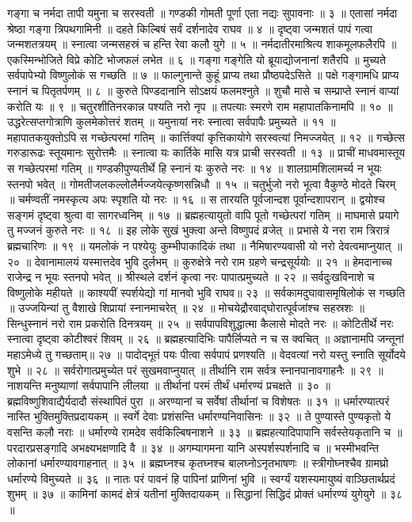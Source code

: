 गङ्गा च नर्मदा तापी यमुना च सरस्वती ॥
गण्डकी गोमती पूर्णा एता नद्यः सुपावनाः ॥ ३ ॥
एतासां नर्मदा श्रेष्ठा गङ्गा त्रिपथगामिनी ॥
दहते किल्बिषं सर्वं दर्शनादेव राघव ॥ ४ ॥
दृष्ट्वा जन्मशतं पापं गत्वा जन्मशतत्रयम् ॥
स्नात्वा जन्मसहस्रं च हन्ति रेवा कलौ युगे ॥ ५ ॥
नर्मदातीरमाश्रित्य शाकमूलफलैरपि ॥
एकस्मिन्भोजिते विप्रे कोटि भोजफलं लभेत ॥ ६ ॥
गङ्गा गङ्गेति यो ब्रूयाद्योजनानां शतैरपि ॥
मुच्यते सर्वपापेभ्यो विष्णुलोकं स गच्छति ॥ ७ ॥
फाल्गुनान्ते कुहूं प्राप्य तथा प्रौष्ठपदेऽसिते ॥
पक्षे गङ्गामधि प्राप्य स्नानं च पितृतर्पणम् ॥ ८ ॥
कुरुते पिण्डदानानि सोऽक्षयं फलमश्नुते ॥
शुचौ मासे च सम्प्राप्ते स्नानं वाप्यां करोति यः ॥ ९ ॥
चतुरशीतिनरकान्न पश्यति नरो नृप ॥
तपत्याः स्मरणे राम महापातकिनामपि ॥ १० ॥
उद्धरेत्सप्तगोत्राणि कुलमेकोत्तरं शतम् ॥
यमुनायां नरः स्नात्वा सर्वपापैः प्रमुच्यते ॥ ११ ॥
महापातकयुक्तोऽपि स गच्छेत्परमां गतिम् ॥
कार्त्तिक्यां कृत्तिकायोगे सरस्वत्यां निमज्जयेत् ॥ १२ ॥
गच्छेत्स गरुडारूढः स्तूयमानः सुरोत्तमैः ॥
स्नात्वा यः कार्तिके मासि यत्र प्राची सरस्वती ॥ १३ ॥
प्राचीं माधवमास्तूय स गच्छेत्परमां गतिम् ॥
गण्डकीपुण्यतीर्थे हि स्नानं यः कुरुते नरः ॥ १४ ॥
शालग्रामशिलामर्च्य न भूयः स्तनपो भवेत् ॥
गोमतीजलकल्लोलैर्मज्जयेत्कृष्णसन्निधौ ॥ १५ ॥
चतुर्भुजो नरो भूत्वा वैकुण्ठे मोदते चिरम् ॥
चर्मण्वतीं नमस्कृत्य अपः स्पृशति यो नरः ॥ १६ ॥
स तारयति पूर्वजान्दश पूर्वान्दशापरान् ॥
द्वयोश्च सङ्गमं दृष्ट्वा श्रुत्वा वा सागरध्वनिम् ॥ १७ ॥
ब्रह्महत्यायुतो वापि पूतो गच्छेत्परां गतिम् ॥
माघमासे प्रयागे तु मज्जनं कुरुते नरः ॥ १८ ॥
इह लोके सुखं भुक्त्वा अन्ते विष्णुपदं व्रजेत् ॥
प्रभासे ये नरा राम त्रिरात्रं ब्रह्मचारिणः ॥ १९ ॥
यमलोकं न पश्येयुः कुम्भीपाकादिकं तथा ॥
नैमिषारण्यवासी यो नरो देवत्वमाप्नुयात् ॥ २० ॥
देवानामालयं यस्मात्तदेव भुवि दुर्लभम् ॥
कुरुक्षेत्रे नरो राम ग्रहणे चन्द्रसूर्ययोः ॥ २१ ॥
हेमदानाच्च राजेन्द्र न भूयः स्तनपो भवेत् ॥
श्रीस्थले दर्शनं कृत्वा नरः पापात्प्रमुच्यते ॥ २२ ॥
सर्वदुःखविनाशे च विष्णुलोके महीयते ॥
काश्यपीं स्पर्शयेद्यो गां मानवो भुवि राघव॥ २३ ॥
सर्वकामदुघावासमृषिलोकं स गच्छति ॥
उज्जयिन्यां तु वैशाखे शिप्रायां स्नानमाचरेत् ॥ २४ ॥
मोचयेद्रौरवाद्घोरात्पूर्वजांश्च सहस्रशः ॥
सिन्धुस्नानं नरो राम प्रकरोति दिनत्रयम् ॥ २५ ॥
सर्वपापविशुद्धात्मा कैलासे मोदते नरः ॥
कोटितीर्थे नरः स्नात्वा दृष्ट्वा कोटीश्वरं शिवम् ॥ २६ ॥
ब्रह्महत्यादिभिः पापैर्लिप्यते न च स क्वचित् ॥
अज्ञानामपि जन्तूनां महाऽमेध्ये तु गच्छताम्॥ २७ ॥
पादोद्भूतं पयः पीत्वा सर्वपापं प्रणश्यति ॥
वेदवत्यां नरो यस्तु स्नाति सूर्योदये शुभे ॥ २८ ॥
सर्वरोगात्प्रमुच्येत परं सुखमवाप्नुयात् ॥
तीर्थानि राम सर्वत्र स्नानपानावगाहनैः ॥ २९ ॥
नाशयन्ति मनुष्याणां सर्वपापानि लीलया ॥
तीर्थानां परमं तीर्थं धर्मारण्यं प्रचक्षते ॥ ३० ॥
ब्रह्मविष्णुशिवाद्यैर्यदादौ संस्थापितं पुरा ॥
अरण्यानां च सर्वेषां तीर्थानां च विशेषतः ॥ ३१ ॥
धर्मारण्यात्परं नास्ति भुक्तिमुक्तिप्रदायकम् ॥
स्वर्गे देवाः प्रशंसन्ति धर्मारण्यनिवासिनः ॥ ३२ ॥
ते पुण्यास्ते पुण्यकृतो ये वसन्ति कलौ नराः ॥
धर्मारण्ये रामदेव सर्वकिल्बिषनाशने ॥ ३३ ॥
ब्रह्महत्यादिपापानि सर्वस्तेयकृतानि च ॥
परदारप्रसङ्गादि अभक्ष्यभक्षणादि वै ॥ ३४ ॥
अगम्यागमना यानि अस्पर्शस्पर्शनादि च ॥
भस्मीभवन्ति लोकानां धर्मारण्यावगाहनात् ॥ ३५ ॥
ब्रह्मघ्नश्च कृतघ्नश्च बालघ्नोऽनृतभाषणः ॥
स्त्रीगोघ्नश्चैव ग्रामघ्रो धर्मारण्ये विमुच्यते ॥ ३६ ॥
नातः परं पावनं हि पापिनां प्राणिनां भुवि ॥
स्वर्ग्यं यशस्यमायुष्यं वाञ्छितार्थप्रदं शुभम् ॥ ३७ ॥
कामिनां कामदं क्षेत्रं यतीनां मुक्तिदायकम् ॥
सिद्धानां सिद्धिदं प्रोक्तं धर्मारण्यं युगेयुगे ॥ ३८ ॥

